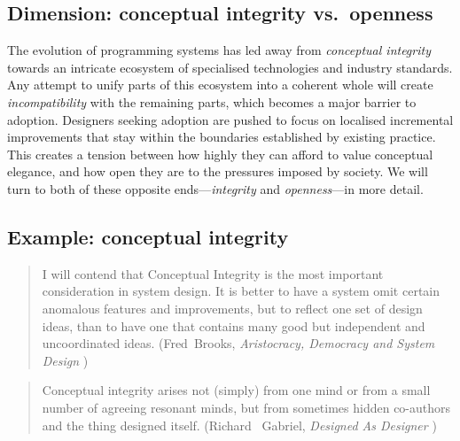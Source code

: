 \documentclass[ twoside,openright,titlepage,numbers=noenddot,headinclude,footinclude,cleardoublepage=empty,abstract=on,
                BCOR=5mm,paper=a4,fontsize=11pt
                ]{scrreprt}
\newcommand{\note}[1]{}
\theoremstyle{definition}
\begin{document}
\hypertarget{dimension-conceptual-integrity-vs.-openness}{\subsection{Dimension: conceptual integrity
vs.~openness}\label{dimension-conceptual-integrity-vs.-openness}}

The evolution of programming systems has led away from \emph{conceptual
integrity} towards an intricate ecosystem of specialised technologies
and industry standards. Any attempt to unify parts of this ecosystem
into a coherent whole will create \emph{incompatibility} with the
remaining parts, which becomes a major barrier to adoption. Designers
seeking adoption are pushed to focus on localised incremental
improvements that stay within the boundaries established by existing
practice. This creates a tension between how highly they can afford to
value conceptual elegance, and how open they are to the pressures
imposed by society. We will turn to both of these opposite
ends---\emph{integrity} and \emph{openness}---in more detail.

\hypertarget{example-conceptual-integrity}{\subsection{Example: conceptual
integrity}\label{example-conceptual-integrity}}

\begin{quote}
I will contend that Conceptual Integrity is the most important
consideration in system design. It is better to have a system omit
certain anomalous features and improvements, but to reflect one set of
design ideas, than to have one that contains many good but independent
and uncoordinated ideas. (Fred~Brooks, \emph{Aristocracy, Democracy and
System Design} \parencite{brooks95aristo})
\end{quote}

\note{The essence of this style can be captured by the phrase “the right thing”. To such a designer it is important to get all of the following characteristics right: Simplicity … Correctness … Consistency … Completeness --- Richard Gabriel}

\begin{quote}
Conceptual integrity arises not (simply) from one mind or from a small
number of agreeing resonant minds, but from sometimes hidden co-authors
and the thing designed itself. (Richard ~Gabriel, \emph{Designed As
Designer} \parencite{DesignedAsDesigner})
\end{quote}
\end{document}
